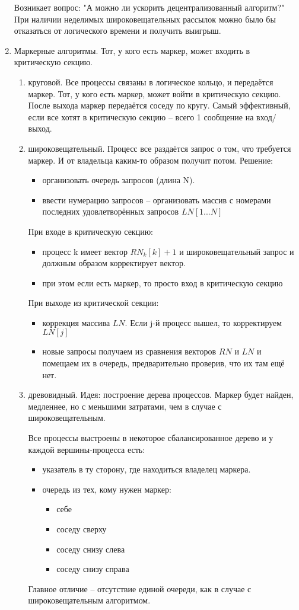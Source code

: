 \documentclass[a4paper,12pt]{article}
\begin{document}
\begin{enumerate}
		Возникает вопрос: "А можно ли ускорить децентрализованный алгоритм?" При наличии 
		неделимых широковещательных рассылок можно было бы отказаться от логического времени 
		и получить выигрыш.
		\item Маркерные алгоритмы. Тот, у кого есть маркер, может входить в критическую	секцию.
		\begin{enumerate}
			\item круговой. Все процессы связаны в логическое кольцо, и передаётся маркер. Тот,
			у кого есть маркер, может войти в критическую секцию. После выхода маркер передаётся
			соседу по кругу. Самый эффективный, если все хотят в критическую секцию -- всего 1
			сообщение на вход/выход.
			\item широковещательный. Процесс все раздаётся запрос о том, что требуется маркер.
			И от владельца каким-то образом получит потом. Решение: 
			\begin{itemize}
				\item организовать очередь запросов (длина N).
				\item ввести нумерацию запросов -- организовать массив с номерами последних
				удовлетворённых запросов $LN[1...N]$
			\end{itemize}
			При входе в критическую секцию:
			\begin{itemize}
				\item процесс k имеет вектор $RN_k[k]+1$ и широковещательный запрос и должным
				образом корректирует вектор.
				\item при этом если есть маркер, то просто вход в критическую секцию
			\end{itemize}
			При выходе из критической секции:
			\begin{itemize}
				\item коррекция массива $LN$. Если j-й процесс вышел, то корректируем $LN[j]$
				\item новые запросы получаем из сравнения векторов $RN$ и $LN$ и помещаем их
				в очередь, предварительно проверив, что их там ещё нет.
			\end{itemize}		
			\item древовидный. Идея: построение дерева процессов. Маркер будет найден, 
			медленнее, но с меньшими затратами, чем в случае с широковещательным.
			
			Все процессы выстроены в некоторое сбалансированное дерево и у каждой
			вершины-процесса есть:
			\begin{itemize}
				\item указатель в ту сторону, где находиться владелец маркера.
				\item очередь из тех, кому нужен маркер:
				\begin{itemize}
					\item себе
					\item соседу сверху
					\item соседу снизу слева
					\item соседу снизу справа
				\end{itemize}
			\end{itemize}
			Главное отличие -- отсутствие единой очереди, как в случае с широковещательным
			алгоритмом.
			

\end{enumerate}
\end{enumerate}
\end{document}
